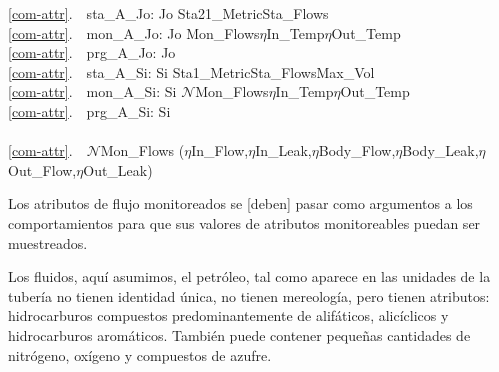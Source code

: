 \ref{com-attr}.\ \ sta\_A\_Jo: Jo {\RIGHTARROW} Sta21\_Metric{\TIMES}Sta\_Flows{\TIMES}{\DOTDOTDOT}\\
\ref{com-attr}.\ \ mon\_A\_Jo: Jo {\RIGHTARROW} Mon\_Flows{\TIMES}$\eta$In\_Temp{\TIMES}$\eta$Out\_Temp{\TIMES}{\DOTDOTDOT}\\
\ref{com-attr}.\ \ prg\_A\_Jo: Jo {\RIGHTARROW} {\DOTDOTDOT} \\
\ref{com-attr}.\ \ sta\_A\_Si: Si {\RIGHTARROW} Sta1\_Metric{\TIMES}Sta\_Flows{\TIMES}Max\_Vol{\TIMES}{\DOTDOTDOT}\\
\ref{com-attr}.\ \ mon\_A\_Si: Si {\RIGHTARROW} $\mathcal{N}$Mon\_Flows{\TIMES}$\eta$In\_Temp{\TIMES}$\eta$Out\_Temp{\TIMES}{\DOTDOTDOT}\\
\ref{com-attr}.\ \ prg\_A\_Si: Si {\RIGHTARROW} {\DOTDOTDOT}\\
\\
\ref{com-attr}.\ \ $\mathcal{N}$Mon\_Flows {\IS} ($\eta$In\_Flow,$\eta$In\_Leak,$\eta$Body\_Flow,$\eta$Body\_Leak,$\eta$Out\_Flow,$\eta$Out\_Leak)
\ep

\noindent
\begynd
\pind Los atributos de flujo monitoreados
\begynd
\pind se [deben] pasar como argumentos a los comportamientos 
\pind para que sus valores de atributos monitoreables puedan ser muestreados.
\afslut
\afslut

\begynd
\pind Los fluidos, aquí asumimos, el petróleo, tal como aparece en las unidades de la tubería
\begynd
\pind no tienen identidad única,
\pind no tienen mereología, 
\pind pero tienen atributos: hidrocarburos compuestos predominantemente de
\begynd
\pind alifáticos, 
\pind alicíclicos y 
\pind hidrocarburos aromáticos.
\afslut
\pind También puede contener pequeñas cantidades de 
\begynd
\pind nitrógeno, 
\pind oxígeno y
\pind compuestos de azufre.
\afslut
\afslut
\afslut

